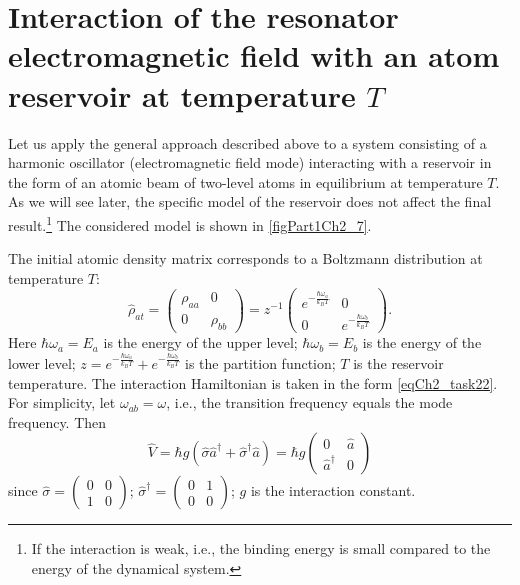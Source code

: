 \section{Interaction of the resonator electromagnetic field with an atom reservoir at temperature $T$}
\label{ch2_6}
Let us apply the general approach described above to a system consisting of a harmonic oscillator (electromagnetic field mode) interacting with a reservoir in the form of an atomic beam of two-level atoms in equilibrium at temperature $T$. As we will see later, the specific model of the reservoir does not affect the final result.\footnote{If the interaction is weak, i.e., the binding energy is small compared to the energy of the dynamical system.} The considered model is shown in \autoref{figPart1Ch2_7}.



The initial atomic density matrix
corresponds to a Boltzmann distribution at temperature $T$:
\begin{equation}
\hat{\rho}_{at} = 
\left(
\begin{array} {cc}
\rho_{aa} & 0  
\\
0 & \rho_{bb} 
\end{array}
\right)
=
z^{-1}
\left(
\begin{array} {cc}
e^{-\frac{\hbar \omega_a}{k_B T}} & 0  
\\
0 & e^{-\frac{\hbar \omega_b}{k_B T}} 
\end{array}
\right).
\end{equation}
Here $\hbar \omega_a = E_a$ is the energy of the upper level;  
$\hbar \omega_b = E_b$ is the energy of the lower level; 
$z = e^{-\frac{\hbar \omega_a}{k_B T}} + e^{-\frac{\hbar \omega_b}{k_B T}}$ is the partition function; $T$ is the reservoir temperature.
The interaction Hamiltonian is taken in the form
\eqref{eqCh2_task22}. For simplicity, let 
$\omega_{ab} = \omega$, i.e., the transition frequency equals the mode frequency. Then  
\begin{equation}
\hat{V} = \hbar g \left(\hat{\sigma}\hat{a}^{\dag} + 
\hat{\sigma}^{\dag}\hat{a} \right)= 
\hbar g 
\left(
\begin{array} {cc}
0 & \hat{a}  
\\
\hat{a}^{\dag} & 0 
\end{array}
\right)
\end{equation}
since  
\(
\hat{\sigma} = 
\left(
\begin{array} {cc}
0 & 0  
\\
1 & 0 
\end{array}
\right)
\);
\(
\hat{\sigma}^{\dag} = 
\left(
\begin{array} {cc}
0 & 1  
\\
0 & 0 
\end{array}
\right)
\); $g$ is the interaction constant.

